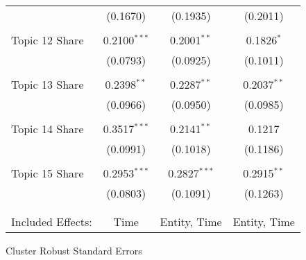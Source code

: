 \begin{center}
\begin{tabular}{lccc}
 & (0.1670)& (0.1935)& (0.2011)\\ 
\\Topic 12 Share & 0.2100$^{***}$ & 0.2001$^{**}$ & 0.1826$^{*}$ \\
 & (0.0793)& (0.0925)& (0.1011)\\ 
\\Topic 13 Share & 0.2398$^{**}$ & 0.2287$^{**}$ & 0.2037$^{**}$ \\
 & (0.0966)& (0.0950)& (0.0985)\\ 
\\Topic 14 Share & 0.3517$^{***}$ & 0.2141$^{**}$ & 0.1217 \\
 & (0.0991)& (0.1018)& (0.1186)\\ 
\\Topic 15 Share & 0.2953$^{***}$ & 0.2827$^{***}$ & 0.2915$^{**}$ \\
 & (0.0803)& (0.1091)& (0.1263)\\ 
\hline \\[-1.8ex]
 \\ Included Effects:  & Time & Entity, Time & Entity, Time\end{tabular}
\end{center}Cluster Robust Standard Errors